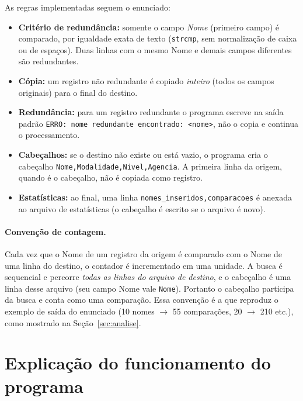\documentclass[11pt,a4paper]{article}
\begin{document}
As regras implementadas seguem o enunciado:
\begin{itemize}[nosep]
  \item \textbf{Critério de redundância:} somente o campo \emph{Nome} (primeiro
        campo) é comparado, por igualdade exata de texto (\texttt{strcmp}, sem
        normalização de caixa ou de espaços). Duas linhas com o mesmo Nome e
        demais campos diferentes são redundantes.
  \item \textbf{Cópia:} um registro não redundante é copiado \emph{inteiro}
        (todos os campos originais) para o final do destino.
  \item \textbf{Redundância:} para um registro redundante o programa escreve na
        saída padrão \texttt{ERRO: nome redundante encontrado: <nome>},
        não o copia e continua o processamento.
  \item \textbf{Cabeçalhos:} se o destino não existe ou está vazio, o programa cria
        o cabeçalho \texttt{Nome,Modalidade,Nivel,Agencia}. A primeira linha da
        origem, quando é o cabeçalho, não é copiada como registro.
  \item \textbf{Estatísticas:} ao final, uma linha
        \texttt{nomes\_inseridos,comparacoes} é anexada ao arquivo de estatísticas
        (o cabeçalho é escrito se o arquivo é novo).
\end{itemize}

\paragraph{Convenção de contagem.} Cada vez que o Nome de um registro da origem é
comparado com o Nome de uma linha do destino, o contador é incrementado em uma
unidade. A busca é sequencial e percorre \emph{todas as linhas do arquivo de
destino}, e o cabeçalho é uma linha desse arquivo (seu campo Nome vale
\texttt{Nome}). Portanto o cabeçalho participa da busca e conta como uma
comparação. Essa convenção é a que reproduz o exemplo de saída do enunciado
(10 nomes $\rightarrow$ 55 comparações, 20 $\rightarrow$ 210 etc.), como
mostrado na Seção~\ref{sec:analise}.

\section{Explicação do funcionamento do programa}
\end{document}
